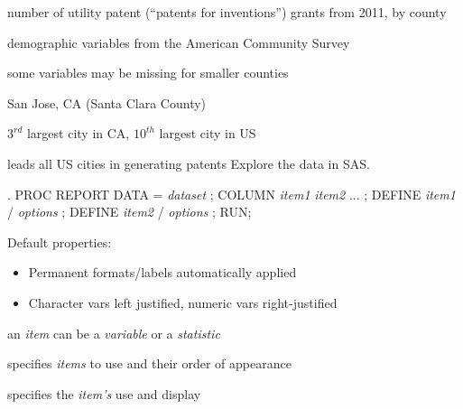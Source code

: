 \begin{frame}
\bi
\item number of utility patent (``patents for inventions'') grants from 2011, by county
\item demographic variables from the American Community Survey
\bi
\item some variables may be missing for smaller counties
\ei
\item San Jose, CA (Santa Clara County)
\bi
\item $3^{rd}$ largest city in CA, $10^{th}$ largest city in US
\item leads all US cities in generating patents
\ei
\ei
\oyo Explore the  data in SAS.
\end{frame}

\begin{frame}[fragile]
\begin{code}{.}
PROC REPORT DATA = \emph{dataset} ;
   COLUMN \emph{item1} \emph{item2} ...  ;
   DEFINE \emph{item1} / \emph{options} ;
   DEFINE \emph{item2} / \emph{options} ;
RUN;
\end{code}
\emp
{} \hspace{0.05in} \emp
{}
Default properties:
\begin{itemize}
\item Permanent formats/labels automatically applied
\item Character vars left justified, numeric vars right-justified
\end{itemize}
\emp
\vskip10pt
\bi
\item an \emph{item} can be a \emph{variable} or a \emph{statistic}
\item {} specifies \emph{items} to use and their order of appearance
\item {} specifies the \emph{item's} use and display
\ei
\end{frame}

